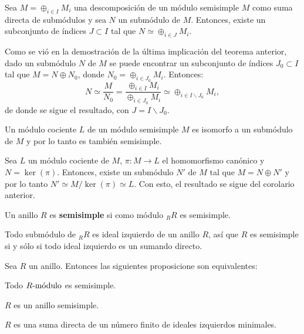 \begin{corolario}
Sea $M = \oplus_{i \in I}M_i$ una descomposición de un módulo semisimple $M$ como suma directa de submódulos y sea $N$ un submódulo de $M$. Entonces, existe un subconjunto de índices $J \subset I $ tal que $N \simeq \oplus_{i \in J}M_i$.
\end{corolario}
\begin{proof*}
Como se vió en la demostración de la última implicación del teorema anterior, dado un submódulo $N$ de $M$ se puede encontrar un subconjunto de índices $J_0 \subset I$  tal que $M = N \oplus N_0$, donde $N_0 = \oplus_{i \in J_0}M_i$. Entonces:
\[ N \simeq \frac{M}{N_0} = \frac{\oplus_{i \in I}M_i}{\oplus_{i \in J_0}M_i} \simeq \oplus_{i \in I \backslash J_0} M_i, \] de donde se sigue el resultado, con $J = I \backslash J_0$.
\end{proof*}
\begin{corolario}
Un módulo cociente $L$ de un módulo semisimple $M$ es isomorfo a un submódulo de $M$ y por lo tanto es también semisimple.
\end{corolario}
\begin{proof*}
Sea $L$ un módulo cociente de $M$, $\pi \colon M \to L$ el homomorfismo canónico y $N = \ker(\pi)$. Entonces, existe un submódulo $N'$ de $M$ tal que $M = N \oplus N'$ y por lo tanto $N'\simeq M/\ker(\pi) \simeq L$. Con esto, el resultado se sigue del corolario anterior.
\end{proof*}
\begin{definicion}
Un anillo $R$ es \textbf{semisimple} si como módulo $_RR$ es semisimple. 
\end{definicion}
Todo submódulo de $_RR$ es ideal izquierdo de un anillo $R$, así que $R$ es semisimple si y sólo si todo ideal izquierdo es un sumando directo.
\begin{teorema}
Sea $R$ un anillo. Entonces las siguientes proposicione son equivalentes:
\begin{bulletList}
\item\label{item:rssimple1} Todo $\modulo{R}$ es semisimple.
\item\label{item:rssimple2} $R$ es un anillo semisimple.
\item\label{item:rssimple3} $R$ es una suma directa de un número finito de ideales izquierdos minimales.
\end{bulletList}
\end{teorema}
